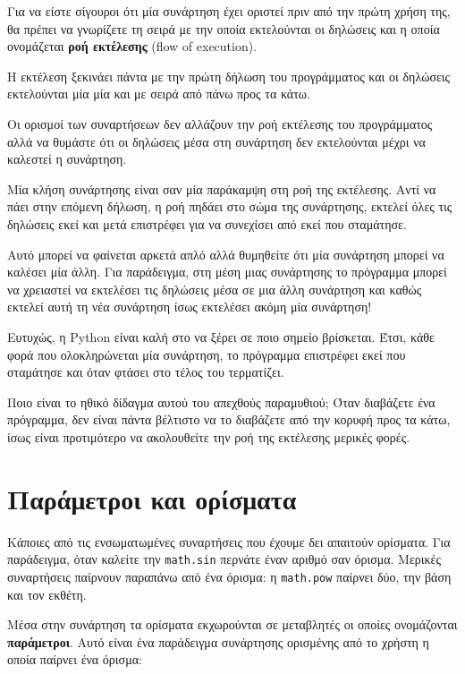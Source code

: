 \documentclass[10pt]{book}
\begin{document}
Για να είστε σίγουροι ότι μία συνάρτηση έχει οριστεί πριν από την πρώτη
χρήση της, θα πρέπει να γνωρίζετε τη σειρά με την οποία εκτελούνται
οι δηλώσεις και η οποία ονομάζεται {\bf ροή εκτέλεσης} (flow of execution).

Η εκτέλεση ξεκινάει πάντα με την πρώτη δήλωση του προγράμματος και  
οι δηλώσεις εκτελούνται μία μία και με σειρά από πάνω προς τα κάτω.

Οι ορισμοί των συναρτήσεων δεν αλλάζουν την ροή εκτέλεσης του
προγράμματος αλλά να θυμάστε ότι οι δηλώσεις μέσα στη συνάρτηση
δεν εκτελούνται μέχρι να καλεστεί η συνάρτηση.

Μία κλήση συνάρτησης είναι σαν μία παράκαμψη στη ροή της εκτέλεσης.
Αντί να πάει στην επόμενη δήλωση, η ροή πηδάει στο σώμα της συνάρτησης,
εκτελεί όλες τις δηλώσεις εκεί και μετά επιστρέφει για να συνεχίσει από
εκεί που σταμάτησε.

Αυτό μπορεί να φαίνεται αρκετά απλό αλλά θυμηθείτε ότι μία συνάρτηση μπορεί
να καλέσει μία άλλη. Για παράδειγμα, στη μέση μιας συνάρτησης το πρόγραμμα μπορεί να χρειαστεί να εκτελέσει τις δηλώσεις μέσα σε μια άλλη συνάρτηση και καθώς εκτελεί αυτή τη νέα συνάρτηση ίσως εκτελέσει ακόμη μία συνάρτηση!


Ευτυχώς, η Python είναι καλή στο να ξέρει σε ποιο σημείο βρίσκεται.
Έτσι, κάθε φορά που ολοκληρώνεται μία συνάρτηση, το πρόγραμμα επιστρέφει
εκεί που σταμάτησε και όταν φτάσει στο τέλος του τερματίζει.

Ποιο είναι το ηθικό δίδαγμα αυτού του απεχθούς παραμυθιού; Όταν
διαβάζετε ένα πρόγραμμα, δεν είναι πάντα βέλτιστο να το διαβάζετε από την κορυφή προς τα κάτω, ίσως είναι προτιμότερο να ακολουθείτε την ροή της εκτέλεσης μερικές φορές.


\section{Παράμετροι και ορίσματα}
\label{parameters}

Κάποιες από τις ενσωματωμένες συναρτήσεις που έχουμε δει απαιτούν
ορίσματα. Για παράδειγμα, όταν καλείτε την  {\tt math.sin} 
περνάτε έναν αριθμό σαν όρισμα. Μερικές συναρτήσεις παίρνουν παραπάνω
από ένα όρισμα: η {\tt math.pow} παίρνει δύο, την βάση και
τον εκθέτη.

Μέσα στην συνάρτηση τα ορίσματα εκχωρούνται σε μεταβλητές οι οποίες
ονομάζονται {\bf παράμετροι}. Αυτό είναι ένα παράδειγμα συνάρτησης ορισμένης από το χρήστη η οποία παίρνει ένα όρισμα:
\end{document}
